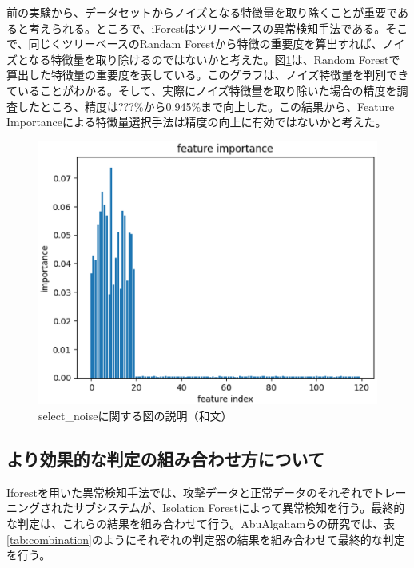 \documentclass{css}
\begin{document}
前の実験から、データセットからノイズとなる特徴量を取り除くことが重要であると考えられる。ところで、iForestはツリーベースの異常検知手法である。そこで、同じくツリーベースのRandam Forestから特徴の重要度を算出すれば、ノイズとなる特徴量を取り除けるのではないかと考えた。図\ref{fig:select_noise}は、Random Forestで算出した特徴量の重要度を表している。このグラフは、ノイズ特徴量を判別できていることがわかる。そして、実際にノイズ特徴量を取り除いた場合の精度を調査したところ、精度は???\%から0.945\%まで向上した。この結果から、Feature Importanceによる特徴量選択手法は精度の向上に有効ではないかと考えた。

\begin{figure}[tb]
    \centering
    \includegraphics[width=\linewidth]{pictures/eps/select_noise.eps}
    \caption{select\_noiseに関する図の説明（和文）}
    \label{fig:select_noise}
\end{figure}

\subsection{より効果的な判定の組み合わせ方について}
Iforestを用いた異常検知手法では、攻撃データと正常データのそれぞれでトレーニングされたサブシステムが、Isolation Forestによって異常検知を行う。最終的な判定は、これらの結果を組み合わせて行う。AbuAlgahamらの研究では、表\ref{tab:combination}のようにそれぞれの判定器の結果を組み合わせて最終的な判定を行う。
\end{document}
